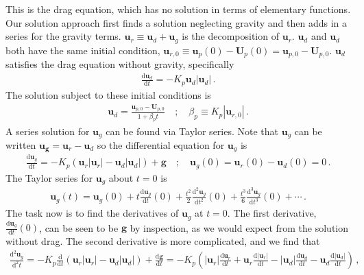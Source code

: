 This is the drag equation, which has no solution in terms of elementary functions. Our solution approach first finds a solution neglecting gravity and then adds in a series for the gravity terms. $\mathbf{u}_r \equiv \mathbf{u}_d + \mathbf{u}_g$ is the decomposition of $\mathbf{u}_r$. $\mathbf{u}_d$ and $\mathbf{u}_d$ both have the same initial condition, $\mathbf{u}_{r,0} \equiv \mathbf{u}_p(0) - \mathbf{U}_p(0) = \mathbf{u}_{p,0} - \mathbf{U}_{p,0}$. $\mathbf{u}_d$ satisfies the drag equation without gravity, specifically
\begin{align}
    \frac{\text{d} \mathbf{u}_d}{\text{d} t} = -K_p \mathbf{u}_d |\mathbf{u}_d| \,.
\end{align}
The solution subject to these initial conditions is
\begin{align}
    \label{ud_exact}
    \mathbf{u}_d = \frac{\mathbf{u}_{p,0} - \mathbf{U}_{p,0}}{1 + \beta_p t} \quad ; \quad \beta_p \equiv K_p |\mathbf{u}_{r,0}| \,.
\end{align}
A series solution for $\mathbf{u}_g$ can be found via Taylor series. Note that $\mathbf{u}_g$ can be written $\mathbf{u_g} = \mathbf{u}_r - \mathbf{u}_d$ so the differential equation for $\mathbf{u}_g$ is
\begin{align}
    \frac{\text{d} \mathbf{u}_g}{\text{d} t} = -K_p (\mathbf{u}_r |\mathbf{u}_r| - \mathbf{u}_d |\mathbf{u}_d|) + \mathbf{g} \quad ; \quad \mathbf{u}_g(0) = \mathbf{u}_r(0) - \mathbf{u}_d(0) = 0 \,.
\end{align}
The Taylor series for $\mathbf{u}_g$ about $t = 0$ is
\begin{align}
    \mathbf{u}_g(t) = \mathbf{u}_g(0) + t \frac{\text{d} \mathbf{u}_g}{\text{d} t}(0) + \frac{t^2}{2} \frac{\text{d}^2 \mathbf{u}_g}{\text{d} t^2}(0) + \frac{t^3}{6} \frac{\text{d}^3 \mathbf{u}_g}{\text{d} t^3}(0) + \cdots \,.
\end{align}
The task now is to find the derivatives of $\mathbf{u}_g$ at $t = 0$. The first derivative, $\frac{\text{d} \mathbf{u}_g}{\text{d} t}(0)$, can be seen to be $\mathbf{g}$ by inspection, as we would expect from the solution without drag. The second derivative is more complicated, and we find that
\begin{align*}
    \frac{\text{d}^2 \mathbf{u}_g}{\text{d}^2 t} = -K_p \frac{\text{d}}{\text{d} t}(\mathbf{u}_r |\mathbf{u}_r| - \mathbf{u}_d |\mathbf{u}_d|) + \frac{\text{d} \mathbf{g}}{\text{d} t} = -K_p \left(|\mathbf{u}_r| \frac{\text{d} \mathbf{u}_r}{\text{d} t} + \mathbf{u}_r \frac{\text{d} |\mathbf{u}_r|}{\text{d} t} - |\mathbf{u}_d| \frac{\text{d} \mathbf{u}_d}{\text{d} t} - \mathbf{u}_d \frac{\text{d} |\mathbf{u}_d|}{\text{d} t}\right) \,,
\end{align*}
